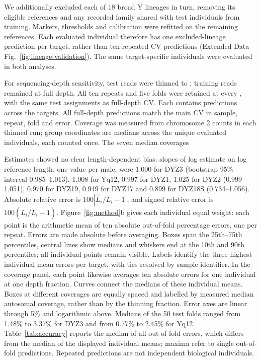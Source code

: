 We additionally excluded each of 18 broad Y lineages in turn, removing its eligible references and any recorded family shared with test individuals from training. Markers, thresholds and calibration were refitted on the remaining references. Each evaluated individual therefore has one excluded-lineage prediction per target, rather than ten repeated CV predictions (Extended Data Fig.~\ref{fig:lineage-validation}). The same target-specific individuals were evaluated in both analyses.

For sequencing-depth sensitivity, test reads were thinned to ; training reads remained at full depth. All ten repeats and five folds were retained at every , with the same test assignments as full-depth CV. Each  contains  predictions across the  targets. All  full-depth predictions match the main CV in sample, repeat, fold and error. Coverage was measured from chromosome 2  counts in each thinned run; group coordinates are medians across the  unique evaluated individuals, each counted once. The seven  median coverages 

Estimates showed no clear length-dependent bias: slopes of log estimate on log reference length, one value per male, were 1.000 for DYZ3 (bootstrap 95\% interval 0.985--1.013), 1.008 for Yq12, 0.997 for DYZ1, 1.025 for DYZ2 (0.999--1.051), 0.970 for DYZ19, 0.949 for DYZ17 and 0.899 for DYZ18S (0.734--1.056). Absolute relative error is $100|\widehat L_i/L_i-1|$, and signed relative error is $100(\widehat L_i/L_i-1)$. Figure~\ref{fig:method}b gives each individual equal weight: each point is the arithmetic mean of ten absolute out-of-fold percentage errors, one per repeat. Errors are made absolute before averaging. Boxes span the 25th--75th percentiles, central lines show medians and whiskers end at the 10th and 90th percentiles; all individual points remain visible. Labels identify the three highest individual mean errors per target, with ties resolved by sample identifier. In the coverage panel, each point likewise averages ten absolute errors for one individual at one depth fraction. Curves connect the medians of these individual means. Boxes at different coverages are equally spaced and labelled by measured median autosomal coverage, rather than by the thinning fraction. Error axes are linear through 5\% and logarithmic above. Medians of the 50 test folds ranged from 1.48\% to 3.37\% for DYZ3 and from 0.77\% to 2.45\% for Yq12. Table~\ref{tab:accuracy} reports the median of all out-of-fold errors, which differs from the median of the displayed individual means; maxima refer to single out-of-fold predictions. Repeated predictions are not independent biological individuals.

